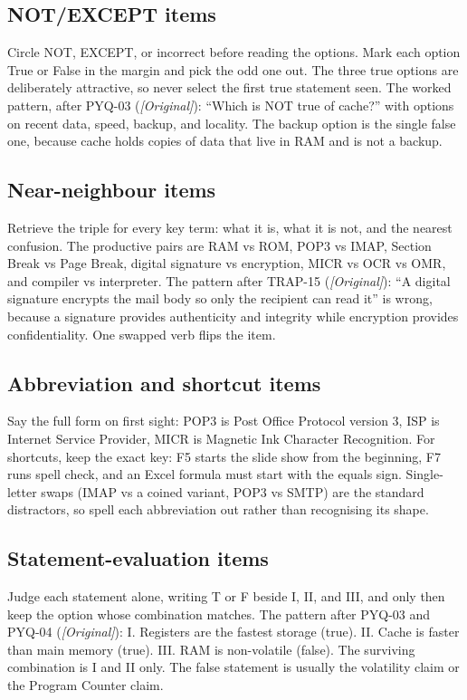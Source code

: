 \documentclass[11pt]{article}
\begin{document}
\subsection*{NOT/EXCEPT items}
Circle NOT, EXCEPT, or incorrect before reading the options. Mark each option
True or False in the margin and pick the odd one out. The three true options
are deliberately attractive, so never select the first true statement seen.
The worked pattern, after PYQ-03 (\textit{[Original]}): ``Which is NOT true
of cache?'' with options on recent data, speed, backup, and locality. The
backup option is the single false one, because cache holds copies of data
that live in RAM and is not a backup.

\subsection*{Near-neighbour items}
Retrieve the triple for every key term: what it is, what it is not, and the
nearest confusion. The productive pairs are RAM vs ROM, POP3 vs IMAP, Section
Break vs Page Break, digital signature vs encryption, MICR vs OCR vs OMR,
and compiler vs interpreter. The pattern after TRAP-15
(\textit{[Original]}): ``A digital signature encrypts the mail body so only
the recipient can read it'' is wrong, because a signature provides
authenticity and integrity while encryption provides confidentiality. One
swapped verb flips the item.

\subsection*{Abbreviation and shortcut items}
Say the full form on first sight: POP3 is Post Office Protocol version 3, ISP
is Internet Service Provider, MICR is Magnetic Ink Character Recognition. For
shortcuts, keep the exact key: F5 starts the slide show from the beginning,
F7 runs spell check, and an Excel formula must start with the equals sign.
Single-letter swaps (IMAP vs a coined variant, POP3 vs SMTP) are the standard
distractors, so spell each abbreviation out rather than recognising its shape.

\subsection*{Statement-evaluation items}
Judge each statement alone, writing T or F beside I, II, and III, and only
then keep the option whose combination matches. The pattern after PYQ-03 and
PYQ-04 (\textit{[Original]}): I. Registers are the fastest storage (true).
II. Cache is faster than main memory (true). III. RAM is non-volatile
(false). The surviving combination is I and II only. The false statement is
usually the volatility claim or the Program Counter claim.
\end{document}
